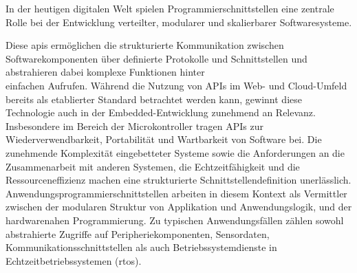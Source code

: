 

In der heutigen digitalen Welt spielen Programmierschnittstellen eine zentrale Rolle bei der Entwicklung verteilter, modularer und skalierbarer Softwaresysteme. 

Diese \gls{apis} ermöglichen die strukturierte Kommunikation zwischen Softwarekomponenten über definierte Protokolle und Schnittstellen und abstrahieren dabei komplexe Funktionen hinter\\ einfachen Aufrufen.
Während die Nutzung von APIs im Web- und Cloud-Umfeld bereits als etablierter Standard betrachtet werden kann, gewinnt diese Technologie auch in der Embedded-Entwicklung zunehmend an Relevanz.
Insbesondere im Bereich der Microkontroller tragen APIs zur Wiederverwendbarkeit, Portabilität und Wartbarkeit von Software bei.
Die zunehmende Komplexität eingebetteter Systeme sowie die Anforderungen an die Zusammenarbeit mit anderen Systemen, die Echtzeitfähigkeit und  die Ressourceneffizienz machen eine strukturierte Schnittstellendefinition unerlässlich.
Anwendungsprogrammierschnittstellen arbeiten in diesem Kontext als Vermittler zwischen der modularen Struktur von Applikation und Anwendungslogik, und der hardwarenahen Programmierung.
Zu typischen Anwendungsfällen zählen sowohl abstrahierte Zugriffe auf Peripheriekomponenten, Sensordaten, Kommunikationsschnittstellen als auch Betriebssystemdienste in Echtzeitbetriebssystemen (\gls{rtos}).
